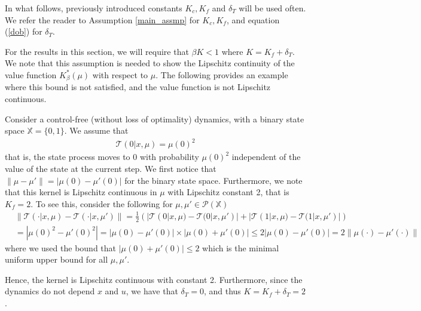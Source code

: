 \documentclass[twoside,11pt]{article}
\def\P{{\mathcal P}}
\begin{document}
In what follows, previously introduced constants $K_c, K_f$ and $\delta_T$ will be used often. We refer the reader to Assumption \ref{main_assmp} for $K_c,K_f$, and equation (\ref{dob}) for $\delta_T$.


For the results in this section, we will require that $\beta K<1$ where $K=K_f+\delta_T$. We note that this assumption is needed to show the Lipschitz continuity of the value function $K_\beta^*(\mu)$ with respect to $\mu$. The following provides 
an example where this bound is not satisfied, and the value function is not Lipschitz continuous.

\begin{example}
Consider a control-free (without loss of optimality) dynamics, with a binary state space $\mathds{X}=\{0,1\}$. We assume that 
\begin{align*}
\mathcal{T}(0|x,\mu)=\mu(0)^2
\end{align*}
that is, the state process moves to $0$ with probability $\mu(0)^2$ independent of the value of the state at the current step. We first notice that $\|\mu-\mu'\|=|\mu(0)-\mu'(0)|$ for the binary state space. Furthermore, we note that this kernel is Lipschitz continuous in $\mu$ with Lipschitz constant 2, that is $K_f=2$. To see this, consider the following for $\mu,\mu'\in\P(\mathds{X})$
\begin{align*}
&\|\mathcal{T}(\cdot|x,\mu)-\mathcal{T}(\cdot|x,\mu')\|=\frac{1}{2}\left(|\mathcal{T}(0|x,\mu)-\mathcal{T}(0|x,\mu')| +| \mathcal{T}(1|x,\mu)-\mathcal{T}(1|x,\mu')|  \right) \\
&=|\mu(0)^2-\mu'(0)^2|= |\mu(0)-\mu'(0)|\times |\mu(0)+\mu'(0)|\leq 2|\mu(0)-\mu'(0)|= 2\|\mu(\cdot)-\mu'(\cdot)\|
\end{align*}
where we used the bound that $ |\mu(0)+\mu'(0)|\leq 2$ which is the minimal uniform upper bound for all $\mu,\mu'$.

Hence, the kernel is Lipschitz continuous with constant 2. Furthermore, since the dynamics do not depend $x$ and $u$, we have that $\delta_T=0$, and thus $K=K_f+\delta_T=2$.




\end{example}
\end{document}
